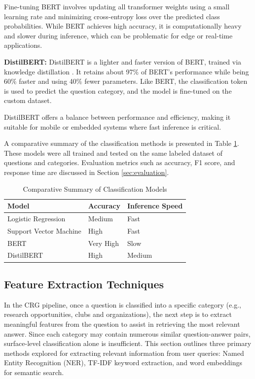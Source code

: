 \documentclass[conference]{IEEEtran}
\begin{document}
Fine-tuning BERT involves updating all transformer weights using a small learning rate and minimizing cross-entropy loss over the predicted class probabilities. 
While BERT achieves high accuracy, it is computationally heavy and slower during inference, which can be problematic for edge or real-time applications.

\textbf{DistilBERT:}
DistilBERT is a lighter and faster version of BERT, trained via knowledge distillation \cite{b13}. 
It retains about 97\% of BERT's performance while being 60\% faster and using 40\% fewer parameters. 
Like BERT, the classification token is used to predict the question category, and the model is fine-tuned on the custom dataset.

DistilBERT offers a balance between performance and efficiency, making it suitable for mobile or embedded systems where fast inference is critical.

A comparative summary of the classification methods is presented in Table \ref{tab:classification_comparison}.
These models were all trained and tested on the same labeled dataset of questions and categories. 
Evaluation metrics such as accuracy, F1 score, and response time are discussed in Section \ref{sec:evaluation}.

\begin{table}[!ht]
    \centering
    \caption{Comparative Summary of Classification Models}
    \label{tab:classification_comparison}
    \begin{tabular}{l|l|l}
        \toprule
        \textbf{Model}         & \textbf{Accuracy}         & \textbf{Inference Speed} \\
        \midrule
        Logistic Regression & Medium & Fast \\
        Support Vector Machine & High & Fast \\
        BERT                & Very High & Slow \\
        DistilBERT          & High & Medium \\
        \bottomrule
    \end{tabular}
\end{table}

\subsection{Feature Extraction Techniques}
In the CRG pipeline, once a question is classified into a specific category (e.g., research opportunities, clubs and organizations), the next step is to extract meaningful features from the question to assist in retrieving the most relevant answer. 
Since each category may contain numerous similar question-answer pairs, surface-level classification alone is insufficient. 
This section outlines three primary methods explored for extracting relevant information from user queries: Named Entity Recognition (NER), TF-IDF keyword extraction, and word embeddings for semantic search.
\end{document}
